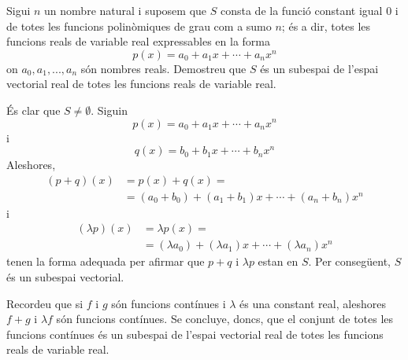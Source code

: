 \begin{exemple}
Sigui $n$ un nombre natural i suposem que $S$ consta de la funció
constant igual $0$ i de totes les funcions polinòmiques de grau com a
sumo $n$; és a dir, totes les funcions reals de variable real expressables
en la forma%
\begin{equation*}
p(x)=a_{0}+a_{1}x+\cdots +a_{n}x^{n}
\end{equation*}%
on $a_{0},a_{1},...,a_{n}$ són nombres reals. Demostreu que $S$
és un subespai de l’espai vectorial real de totes les funcions reals de
variable real.

\end{exemple}
\begin{solucio}
És clar que $S\neq \emptyset $. Siguin 
\begin{equation*}
p(x)=a_{0}+a_{1}x+\cdots +a_{n}x^{n}
\end{equation*}%
i%
\begin{equation*}
q(x)=b_{0}+b_{1}x+\cdots +b_{n}x^{n}
\end{equation*}%
Aleshores,%
\begin{align*}
(p+q)(x) &=p(x)+q(x)= \\
&=(a_{0}+b_{0})+(a_{1}+b_{1})x+\cdots +(a_{n}+b_{n})x^{n}
\end{align*}%
i%
\begin{align*}
(\lambda p)(x) &=\lambda p(x)= \\
&=(\lambda a_{0})+(\lambda a_{1})x+\cdots +(\lambda a_{n})x^{n}
\end{align*}%
tenen la forma adequada per afirmar que $p+q$ i $\lambda p$ estan en $%
S $. Per consegüent, $S$ és un subespai vectorial.
\end{solucio}

\begin{exemple}
Recordeu que si $f$ i $g$ són funcions contínues i $\lambda $ és una
constant real, aleshores $f+g$ i $\lambda f$ són funcions contínues. Se
concluye, doncs, que el conjunt de totes les funcions contínues és un
subespai de l’espai vectorial real de totes les funcions reals de
variable real.
\end{exemple}

